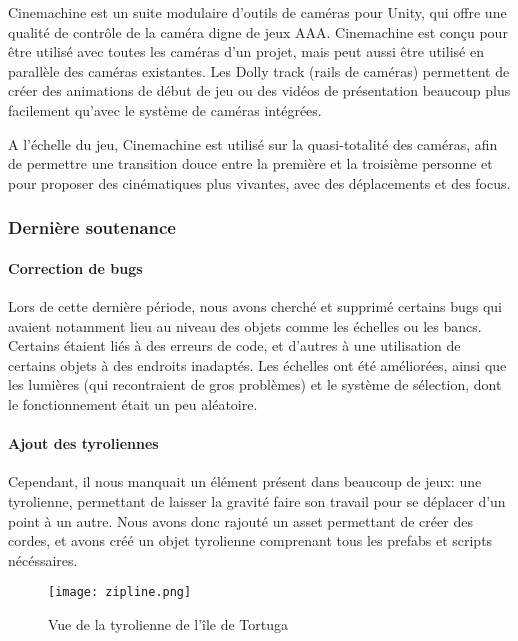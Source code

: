 			Cinemachine est un suite modulaire d'outils de caméras pour Unity, qui offre 
			une qualité de contrôle de la caméra digne de jeux AAA. Cinemachine est conçu pour être utilisé 
			avec toutes les caméras d'un projet, mais peut aussi être utilisé en parallèle des caméras existantes. 
			Les Dolly track (rails de caméras) permettent de créer des animations de début de jeu ou 
			des vidéos de présentation beaucoup plus facilement qu'avec le système de caméras intégrées. 

			A l'échelle du jeu, Cinemachine est utilisé sur la quasi-totalité des caméras, 
			afin de permettre une transition douce entre la première et la troisième personne et pour 
			proposer des cinématiques plus vivantes, avec des déplacements et des focus.


	\vspace{0.5cm}
	\subsubsection{Dernière soutenance}
	\vspace{0.5cm}

		\paragraph{Correction de bugs}
			
			Lors de cette dernière période, nous avons cherché et supprimé certains bugs qui avaient notamment lieu au niveau des objets comme les échelles ou les bancs. 
			Certains étaient liés à des erreurs de code, et d'autres à une utilisation de certains objets à des endroits inadaptés.
			Les échelles ont été améliorées, ainsi que les lumières (qui recontraient de gros problèmes) et le système de 
			sélection, dont le fonctionnement était un peu aléatoire.

		\paragraph{Ajout des tyroliennes}

			Cependant, il nous manquait un élément présent dans beaucoup de jeux: une tyrolienne, permettant de laisser la 
			gravité faire son travail pour se déplacer d'un point à un autre. Nous avons donc rajouté un asset permettant 
			de créer des cordes, et avons créé un objet tyrolienne comprenant tous les prefabs et scripts nécéssaires.

			\begin{figure}[hbt!]
				\centering
				\texttt{[image: zipline.png]}
				\caption{Vue de la tyrolienne de l'île de Tortuga}
			\end{figure}
			\FloatBarrier


